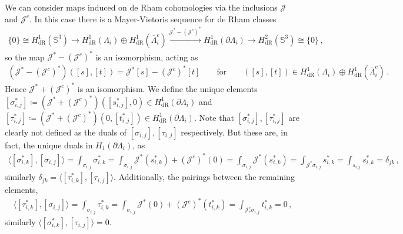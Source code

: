 \documentclass[11pt]{article}
\theoremstyle{plain}
\theoremstyle{definition}
\theoremstyle{remark}
\newcommand{\ST}{\Lambda}
\begin{document}
We can consider maps induced on de Rham cohomologies via the inclusions \(\mathcal J\) and \(\mathcal J^c\). In this case there is a Mayer-Vietoris sequence for de Rham classes
\begin{align*}
    \{0\} \cong H^{1}_{\mathrm{dR}} ( \mathbb{S}^3 ) \to H^{1}_{\mathrm{dR}} ( \ST_i ) \oplus H^{1}_{\mathrm{dR}} ( \overline{\ST}^c_i ) \xrightarrow{\mathcal{J}^* -(\mathcal{J}^c)^*} H^{1}_{\mathrm{dR}} ( \partial \ST_i ) \to H^{2}_{\mathrm{dR}} (  \mathbb{S}^3 ) \cong \{0\} \, , 
\end{align*} 
so the map \(\mathcal{J}^*- (\mathcal{J}^c)^*\) is an isomorphism, acting as
\begin{align*}
    (\mathcal{J}^*- (\mathcal{J}^c)^*) ([s],[t]) = \mathcal{J}^*[s]- (\mathcal{J}^c)^*[t] \qquad \text{for} \qquad ([s], [t]) \in H^{1}_{\mathrm{dR}} ( \ST_i ) \oplus H^{1}_{\mathrm{dR}} ( \overline{\ST}^c_i ) \, .
\end{align*}
Hence \(\mathcal{J}^* + (\mathcal{J}^c)^* \) is an isomorphism. We define the unique elements \([\sigma_{i,j}^*] \coloneqq (\mathcal{J}^* + (\mathcal{J}^c)^*) ( [s_{i,j}^*] , 0) \in H^1_{\mathrm{dR}} (\partial \ST_i)\) and \([\tau_{i,j}^*] \coloneqq (\mathcal{J}^* + (\mathcal{J}^c)^*)( 0, [t_{i,j}^*] ) \in H^1_{\mathrm{dR}} (\partial \ST_i)\). Note that \([\sigma_{i,j}^*], [\tau_{i,j}^*]\) are clearly not defined as the duals of \([\sigma_{i,j}], [\tau_{i,j}]\) respectively. But these are, in fact, the unique duals in \(H_1(\partial \ST_i)\), as
\begin{align*}
\big\langle [\sigma^*_{i,k}],[\sigma_{i,j}] \big\rangle
=\int_{\sigma_{i,j}} \sigma^*_{i,k}
=\int_{\sigma_{i,j}} \mathcal J^* (s^*_{i,k}) +  (\mathcal{J}^c)^* (0)
= \int_{\sigma_{i,j}} \mathcal J^* (s^*_{i,k})
= \int_{\mathcal J^* \sigma_{i,j}} s^*_{i,k}
= \int_{s_{i,j}} s^*_{i,k}
= \delta_{jk} \, , 
\end{align*}
similarly \(\delta_{jk} = \langle  [\tau_{i,k}^*]  , [\tau_{i,j}] \rangle\). Additionally, the pairings between the remaining elements,
\begin{align*}
\big\langle [\tau^*_{i,k}],[\sigma_{i,j}] \big\rangle
= \int_{\sigma_{i,j}} \tau^*_{i,k}
= \int_{\sigma_{i,j}}   \mathcal J^* (0) +  (\mathcal{J}^c)^* (t^*_{i,k})
= \int_{\mathcal{J}^c_* \sigma_{i,j}}   t^*_{i,k}
= 0\, , 
\end{align*}
similarly \(\langle [\sigma^*_{i,k}],[\tau_{i,j}]\rangle=0\).
\end{document}
